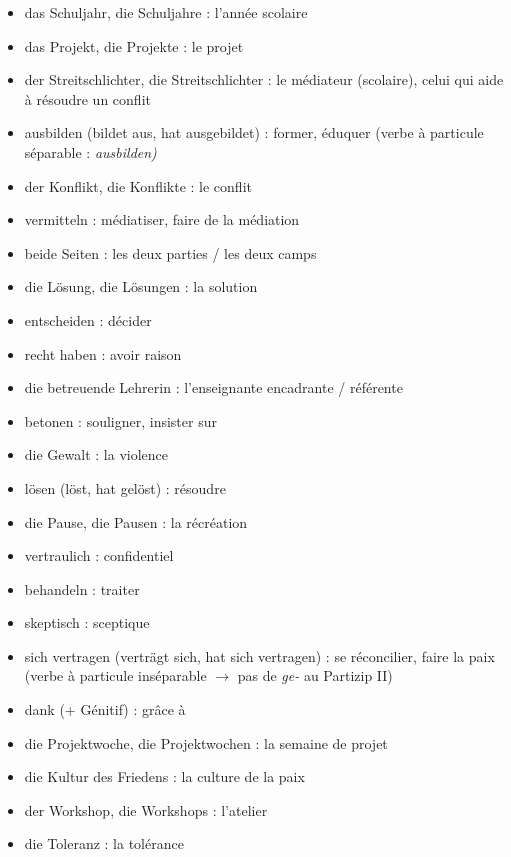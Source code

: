 \documentclass[11pt]{article}
\newcommand{\cle}[1]{{\popxbold\color{popdark}#1}}
\newcommand{\all}[1]{\ifmmode\text{\textit{#1}}\else\begingroup\selectlanguage{ngerman}\itshape #1\endgroup\fi}
\begin{document}
\begin{definition}
\begin{itemize}
    \item \cle{das Schuljahr, die Schuljahre} : l'année scolaire
    \item \cle{das Projekt, die Projekte} : le projet
    \item \cle{der Streitschlichter, die Streitschlichter} : le médiateur (scolaire), celui qui aide à résoudre un conflit
    \item \cle{ausbilden} (bildet aus, hat ausgebildet) : former, éduquer (verbe à particule séparable : \all{ausbilden})
    \item \cle{der Konflikt, die Konflikte} : le conflit
    \item \cle{vermitteln} : médiatiser, faire de la médiation
    \item \cle{beide Seiten} : les deux parties / les deux camps
    \item \cle{die Lösung, die Lösungen} : la solution
    \item \cle{entscheiden} : décider
    \item \cle{recht haben} : avoir raison
    \item \cle{die betreuende Lehrerin} : l'enseignante encadrante / référente
    \item \cle{betonen} : souligner, insister sur
    \item \cle{die Gewalt} : la violence
    \item \cle{lösen} (löst, hat gelöst) : résoudre
    \item \cle{die Pause, die Pausen} : la récréation
    \item \cle{vertraulich} : confidentiel
    \item \cle{behandeln} : traiter
    \item \cle{skeptisch} : sceptique
    \item \cle{sich vertragen} (verträgt sich, hat sich vertragen) : se réconcilier, faire la paix (verbe à particule inséparable $\to$ pas de \emph{ge-} au Partizip II)
    \item \cle{dank} (+ Génitif) : grâce à
    \item \cle{die Projektwoche, die Projektwochen} : la semaine de projet
    \item \cle{die Kultur des Friedens} : la culture de la paix
    \item \cle{der Workshop, die Workshops} : l'atelier
    \item \cle{die Toleranz} : la tolérance

\end{itemize}
\end{definition}
\end{document}
